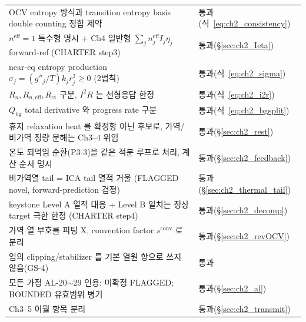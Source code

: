 \documentclass[11pt,a4paper]{article}
\newcommand{\eff}{\mathrm{eff}}
\newcommand{\bg}{\mathrm{bg}}
\newcommand{\conv}{\mathrm{conv}}
\begin{document}
{\begin{longtable}{p{} p{}}
OCV entropy 방식과 transition entropy basis double counting 정합 제약 & 통과(식~\eqref{eq:ch2_consistency}) \\
$n^\eff=1$ 특수형 명시 + Ch4 일반형 $\sum_j n^\eff_j I_j\eta_j$ forward-ref (CHARTER step3) & 통과(\S\ref{sec:ch2_Ieta}) \\
near-eq entropy production $\sigma_j=(g''_j/T)k_j r_j^2\ge0$ (2법칙) & 통과(식~\eqref{eq:ch2_sigma}) \\
$R_n,R_{n,\eff},R_{\mathrm{ct}}$ 구분, $I^2R$ 는 선형응답 한정 & 통과(식~\eqref{eq:ch2_i2r}) \\
$Q_\bg$ total derivative 와 progress rate 구분 & 통과(식~\eqref{eq:ch2_bgsplit}) \\
휴지 relaxation heat 를 확정항 아닌 후보로, 가역/비가역 정량 분해는 Ch3--4 위임 & 통과(\S\ref{sec:ch2_rest}) \\
온도 되먹임 순환(P3-3)을 같은 적분 루프로 처리, 계산 순서 명시 & 통과(\S\ref{sec:ch2_feedback}) \\
비가역열 tail = ICA tail 열적 거울 (FLAGGED novel, forward-prediction 검정) & 통과(\S\ref{sec:ch2_thermal_tail}) \\
keystone Level A 열적 대응 + Level B 일치는 정상 target 극한 한정 (CHARTER step4) & 통과(\S\ref{sec:ch2_decomp}) \\
가역 열 부호를 피팅 X, convention factor $s^{\conv}$ 로 분리 & 통과(\S\ref{sec:ch2_revOCV}) \\
임의 clipping/stabilizer 를 기본 열원 항으로 쓰지 않음(GS-4) & 통과 \\
모든 가정 AL-20$\sim$29 인용; 미확정 FLAGGED; BOUNDED 유효범위 병기 & 통과(\S\ref{sec:ch2_al}) \\
Ch3--5 이월 항목 분리 & 통과(\S\ref{sec:ch2_transmit}) \\
\bottomrule
\end{longtable}
}

\end{document}
